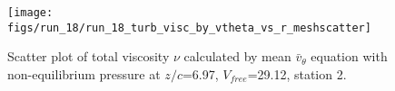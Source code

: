 \begin{figure}[H]
\centering
\texttt{[image: figs/run\_18/run\_18\_turb\_visc\_by\_vtheta\_vs\_r\_meshscatter]}
\caption{Scatter plot of total viscosity $\nu$ calculated by mean $\bar{v}_{\theta}$ equation with non-equilibrium pressure at $z/c$=6.97, $V_{free}$=29.12, station 2.}
\label{fig:run_18_turb_visc_by_vtheta_vs_r_meshscatter}
\end{figure}


